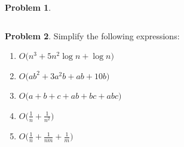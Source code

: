 \documentclass[10pt]{article}
\theoremstyle{definition}
\newtheorem{problem}{Problem}
\begin{document}
\begin{problem}
{\begin{tabular}{c c c c c c}
\end{tabular}
}
\end{problem}

\newpage
\begin{problem}
    Simplify the following expressions:

\begin{enumerate}
    \item $O\bigg(n^3 + 5n^2\log n + \log n \bigg)$
    \vspace{1.5in}
\item $O\bigg(ab^2 + 3a^2b + ab + 10b\bigg)$
    \vspace{1.5in}
\item $O\bigg(a + b + c + ab + bc + abc\bigg)$
    \vspace{1.5in}
\item $O\bigg(\frac 1 n + \frac 1 {n^2}\bigg)$
    \vspace{1.5in}
\item $O\bigg(\frac 1 n + \frac 1 {nm} + \frac 1 m \bigg)$
    \vspace{1.5in}
\end{enumerate}
\end{problem}

\end{document}

